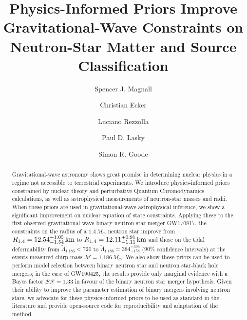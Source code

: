 \documentclass[twocolumn]{aastex631}
\begin{document}
	
\title{Physics-Informed Priors Improve Gravitational-Wave Constraints on Neutron-Star
  Matter and Source Classification}



\author[0009-0000-7037-1809]{Spencer J. Magnall}

\author[0000-0002-8669-4300]{Christian Ecker}

\author[0000-0002-1330-7103]{Luciano Rezzolla}

\author[0000-0003-3763-1386]{Paul D. Lasky}


\author[0000-0002-9575-5152]{Simon R. Goode}


\begin{abstract}
 Gravitational-wave astronomy shows great promise in determining nuclear
 physics in a regime not accessible to terrestrial experiments. We
 introduce physics-informed priors constrained by nuclear theory and
 perturbative Quantum Chromodynamics calculations, as well as
 astrophysical measurements of neutron-star masses and radii. When these
 priors are used in gravitational-wave astrophysical inference, we show a
 significant improvement on nuclear equation of state constraints.
 Applying these to the first observed gravitational-wave binary
 neutron-star merger GW170817, the constraints on the radius of a
 $1.4\,M_\odot$ neutron star improve from $R_{1.4} =
 {12.54^{+1.05}_{-1.54}} \, {\rm km}$ to $R_{1.4} = 12.11^{+0.91}_{-1.11}
 \,{\rm km}$ and those on the tidal deformability from
 $\tilde{\Lambda}_{1.186} < 720$ to $\tilde{\Lambda}_{1.186} =
 384^{+306}_{-158}$ ($90\%$ confidence intervals) at the events measured
 chirp mass $\mathcal{M}=1.186\,M_\odot$. We also show these priors can
 be used to perform model selection between binary neutron star and
 neutron star-black hole mergers; in the case of GW190425, the results
 provide only marginal evidence with a Bayes factor $\mathcal{BF}=1.33$
 in favour of the binary neutron star merger hypothesis. Given their
 ability to improve the parameter estimation of binary mergers involving
 neutron stars, we advocate for these physics-informed priors to be used
 as standard in the literature and provide open-source code for
 reproducibility and adaptation of the method.
\end{abstract}
	
\end{document}
